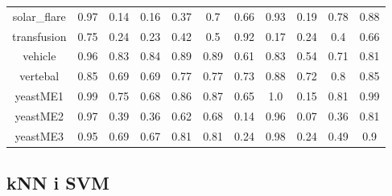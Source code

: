 \documentclass{article}%
\begin{document}
\begin{tabular}{|c|c|c|c|c|c|c|c|c|c|c|}
solar\_flare&0.97&0.14&0.16&0.37&0.7&0.66&0.93&0.19&0.78&0.88\\%
transfusion&0.75&0.24&0.23&0.42&0.5&0.92&0.17&0.24&0.4&0.66\\%
vehicle&0.96&0.83&0.84&0.89&0.89&0.61&0.83&0.54&0.71&0.81\\%
vertebal&0.85&0.69&0.69&0.77&0.77&0.73&0.88&0.72&0.8&0.85\\%
yeastME1&0.99&0.75&0.68&0.86&0.87&0.65&1.0&0.15&0.81&0.99\\%
yeastME2&0.97&0.39&0.36&0.62&0.68&0.14&0.96&0.07&0.36&0.81\\%
yeastME3&0.95&0.69&0.67&0.81&0.81&0.24&0.98&0.24&0.49&0.9\\%
\hline%
\end{tabular}

%
\subsection*{kNN i SVM}%
\end{document}
